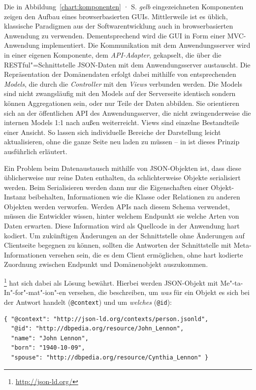 Die in Abbildung~\ref{chart:komponenten} · S.\pageref{chart:komponenten} \emph{gelb} eingezeichneten Komponenten zeigen den Aufbau eines browserbasierten GUIs. Mittlerweile ist es üblich, klassische Paradigmen aus der Softwarentwicklung auch in browserbasierten Anwendung zu verwenden. Dementsprechend wird die GUI in Form einer MVC-Anwendung implementiert. Die Kommunikation mit dem Anwendungsserver wird in einer eigenen Komponente, dem \emph{API-Adapter}, gekapselt, die über die RESTful"=Schnittstelle JSON-Daten mit dem Anwendungsserver austauscht. Die Repräsentation der Domänendaten erfolgt dabei mithilfe von entsprechenden \emph{Models}, die durch die \emph{Controller} mit den \emph{Views} verbunden werden. Die Models sind nicht zwangsläufig mit den Models auf der Serverseite identisch sondern können Aggregationen sein, oder nur Teile der Daten abbilden. Sie orientieren sich an der öffentlichen API des Anwendungsserver, die nicht zwingenderweise die internen Models 1:1 nach außen weiterreicht. Views sind einzelne Bestandteile einer Ansicht. So lassen sich individuelle Bereiche der Darstellung leicht aktualisieren, ohne die ganze Seite neu laden zu müssen -- in \cite[S.1--5 und S.65--72]{maccaw2011javascript} ist dieses Prinzip ausführlich erläutert.

Ein Problem beim Datenaustausch mithilfe von JSON-Objekten ist, dass diese üblicherweise nur reine Daten enthalten, da schlichterweise Objekte serialisiert werden. Beim Serialisieren werden dann nur die Eigenschaften einer Objekt-Instanz beibehalten, Informationen wie die Klasse oder Relationen zu anderen Objekten werden verworfen. Werden APIs nach diesem Schema verwendet, müssen die Entwickler wissen, hinter welchem Endpunkt sie welche Arten von Daten erwarten. Diese Information wird als Quellcode in der Anwendung hart kodiert. Um zukünftigen Änderungen an der Schnittstelle ohne Änderungen auf Clientseite begegnen zu können, sollten die Antworten der Schnittstelle mit Meta-Informationen versehen sein, die es dem Client ermöglichen, ohne hart kodierte Zuordnung zwischen Endpunkt und Domänenobjekt auszukommen. 

\begin{samepage}
\footnote{\url{http://json-ld.org/}} hat sich dabei als Lösung bewährt. Hierbei werden JSON-Objekt mit Me"-ta-In"-for"-mat"-ion"-en versehen, die beschreiben, um \emph{was} für ein Objekt es sich bei der Antwort handelt (\texttt{@context}) und um \emph{welches} (\texttt{@id}):

\begin{verbatim}
{ "@context": "http://json-ld.org/contexts/person.jsonld",
  "@id": "http://dbpedia.org/resource/John_Lennon",
  "name": "John Lennon",
  "born": "1940-10-09",
  "spouse": "http://dbpedia.org/resource/Cynthia_Lennon" }
\end{verbatim}
\end{samepage}

